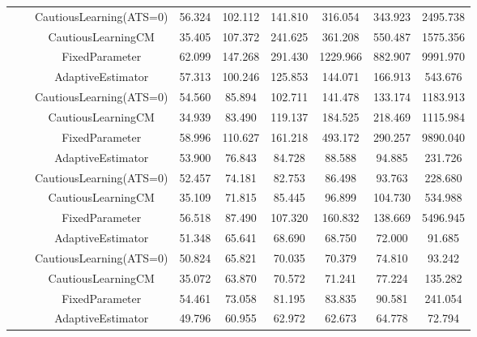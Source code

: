 \begin{table}[!h]
\begin{tabular}[t]{ccccccccc}
 &  & CautiousLearning(ATS=0) & 56.324 & 102.112 & 141.810 & 316.054 & 343.923 & 2495.738\\

 &  & CautiousLearningCM & 35.405 & 107.372 & 241.625 & 361.208 & 550.487 & 1575.356\\

 & \multirow[t]{-4}{*}{\centering\arraybackslash 0.25} & FixedParameter & 62.099 & 147.268 & 291.430 & 1229.966 & 882.907 & 9991.970\\
\cmidrule{2-9}
 &  & AdaptiveEstimator & 57.313 & 100.246 & 125.853 & 144.071 & 166.913 & 543.676\\

 &  & CautiousLearning(ATS=0) & 54.560 & 85.894 & 102.711 & 141.478 & 133.174 & 1183.913\\

 &  & CautiousLearningCM & 34.939 & 83.490 & 119.137 & 184.525 & 218.469 & 1115.984\\

 & \multirow[t]{-4}{*}{\centering\arraybackslash 0.35} & FixedParameter & 58.996 & 110.627 & 161.218 & 493.172 & 290.257 & 9890.040\\
\cmidrule{2-9}
 &  & AdaptiveEstimator & 53.900 & 76.843 & 84.728 & 88.588 & 94.885 & 231.726\\

 &  & CautiousLearning(ATS=0) & 52.457 & 74.181 & 82.753 & 86.498 & 93.763 & 228.680\\

 &  & CautiousLearningCM & 35.109 & 71.815 & 85.445 & 96.899 & 104.730 & 534.988\\

 & \multirow[t]{-4}{*}{\centering\arraybackslash 0.50} & FixedParameter & 56.518 & 87.490 & 107.320 & 160.832 & 138.669 & 5496.945\\
\cmidrule{2-9}
 &  & AdaptiveEstimator & 51.348 & 65.641 & 68.690 & 68.750 & 72.000 & 91.685\\

 &  & CautiousLearning(ATS=0) & 50.824 & 65.821 & 70.035 & 70.379 & 74.810 & 93.242\\

 &  & CautiousLearningCM & 35.072 & 63.870 & 70.572 & 71.241 & 77.224 & 135.282\\

 & \multirow[t]{-4}{*}{\centering\arraybackslash 0.75} & FixedParameter & 54.461 & 73.058 & 81.195 & 83.835 & 90.581 & 241.054\\
\cmidrule{2-9}
 &  & AdaptiveEstimator & 49.796 & 60.955 & 62.972 & 62.673 & 64.778 & 72.794\\


\end{tabular}
\end{table}
